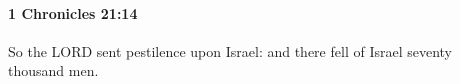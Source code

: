 
		\paragraph{1 Chronicles 21:14} %
			\label{1CHRONICLES-21-14}

			So the LORD sent pestilence upon Israel: and there fell of Israel seventy thousand men.


